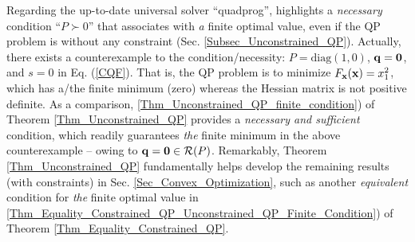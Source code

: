 \documentclass{imaman}
\newcommand{\bfx}{{\bf x}}
\newcommand{\bfq}{{\bf q}}
\newcommand{\bfzero}{{\bf 0}}
\newcommand{\calR}{{\mathcal R}}
\numberwithin{equation}{section}
\begin{document}
\begin{example}
\begin{remark}
Regarding the up-to-date universal solver ``quadprog'', \cite{MATLAB} highlights a \textit{necessary} condition ``$P\succ 0$'' that associates with \textit{a} finite optimal value, even if the QP problem is without any constraint (Sec. \ref{Subsec_Unconstrained_QP}). Actually, there exists a counterexample to the condition/necessity: $P=\mbox{diag}(1,0)$, $\bfq=\bfzero$, and $s=0$ in Eq. (\ref{CQF}). That is, the QP problem is to minimize $F_\bfx(\bfx)=x_1^2$, which has a/the finite minimum (zero) whereas the Hessian matrix is not positive definite. As a comparison, \ref{Thm_Unconstrained_QP_finite_condition}) of Theorem \ref{Thm_Unconstrained_QP} provides a \textit{necessary and sufficient} condition, which readily guarantees \textit{the} finite minimum in the above counterexample -- owing to $\bfq=\bfzero\in\calR(P)$. Remarkably, Theorem \ref{Thm_Unconstrained_QP} fundamentally helps develop the remaining results (with constraints) in Sec. \ref{Sec_Convex_Optimization}, such as another \textit{equivalent} condition for \textit{the} finite optimal value in \ref{Thm_Equality_Constrained_QP_Unconstrained_QP_Finite_Condition}) of Theorem \ref{Thm_Equality_Constrained_QP}.
\end{remark}

\label{Ex_MATLAB}
\end{example}
\end{document}
